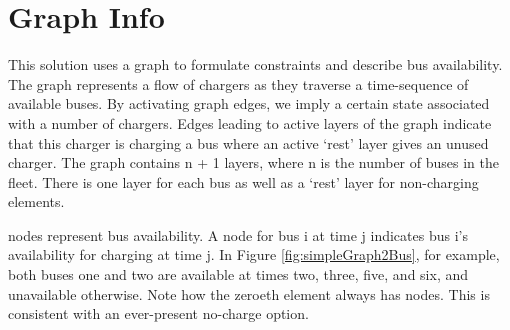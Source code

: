 \section{Graph Info}
This solution uses a graph to formulate constraints and describe bus availability. The graph represents a flow of chargers as they traverse a time-sequence of available buses.  By activating graph edges, we imply a certain state associated with a number of chargers. Edges leading to active layers of the graph indicate that this charger is charging a bus where an active `rest' layer gives an unused charger. The graph contains n + 1 layers, where n is the number of buses in the fleet.  There is one layer for each bus as well as a `rest' layer for non-charging elements.
\par nodes represent bus availability.  A node for bus i at time j indicates bus i's availability for charging at time j.  In Figure \ref{fig:simpleGraph2Bus}, for example, both buses one and two are available at times two, three, five, and six, and unavailable otherwise.  Note how the zeroeth element always has nodes.  This is consistent with an ever-present no-charge option.

